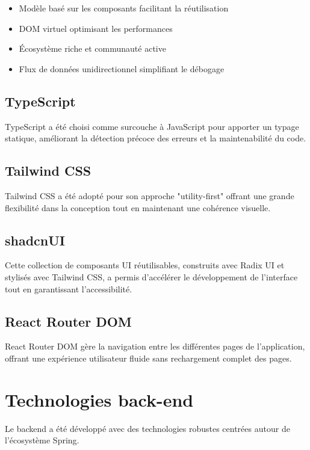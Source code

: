 \begin{itemize}
  \item Modèle basé sur les composants facilitant la réutilisation
  \item DOM virtuel optimisant les performances
  \item Écosystème riche et communauté active
  \item Flux de données unidirectionnel simplifiant le débogage
\end{itemize}

\subsection{TypeScript}

TypeScript a été choisi comme surcouche à JavaScript pour apporter un typage statique, améliorant la détection précoce des erreurs et la maintenabilité du code.

\subsection{Tailwind CSS}

Tailwind CSS a été adopté pour son approche "utility-first" offrant une grande flexibilité dans la conception tout en maintenant une cohérence visuelle.

\subsection{shadcnUI}

Cette collection de composants UI réutilisables, construits avec Radix UI et stylisés avec Tailwind CSS, a permis d'accélérer le développement de l'interface tout en garantissant l'accessibilité.

\subsection{React Router DOM}

React Router DOM gère la navigation entre les différentes pages de l'application, offrant une expérience utilisateur fluide sans rechargement complet des pages.

\section{Technologies back-end}

Le backend a été développé avec des technologies robustes centrées autour de l'écosystème Spring.

